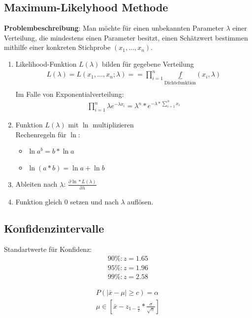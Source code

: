 \documentclass{article}
\begin{document}
\subsection{Maximum-Likelyhood Methode}
\textbf{Problembeschreibung}: Man m\"ochte f\"ur einen unbekannten Parameter $\lambda$
einer Verteilung, die mindestens einen Parameter besitzt, einen Sch\"atzwert bestimmen
mithilfe einer konkreten Stichprobe $(x_1, \ldots, x_n)$.

\begin{enumerate}
	\item Likelihood-Funktion $L(\lambda)$ bilden f\"ur gegebene Verteilung
		\begin{align}
			L(\lambda) = L(x_1, \ldots, x_n; \lambda) = = \prod_{i=1}^n
			\underbrace{f}_{\text{Dichtefunktion}}(x_i, \lambda)\\
		\end{align}
		Im Falle von Exponentialverteilung:\\
		\begin{align}
			\prod_{i=1}^n \lambda e^{-\lambda x_i} = \lambda^n * e^{-\lambda * \sum_{i=1}^{n}x_i}
		\end{align}
	\item Funktion $L(\lambda)$ mit $\ln$ multiplizieren\\
		Rechenregeln f\"ur $\ln$:
		\begin{itemize}
			\item $\ln a^b = b * \ln a$
			\item $\ln (a*b) = \ln a + \ln b$
		\end{itemize}
	\item Ableiten nach $\lambda$: $\frac{\partial \ln * L(\lambda)}{\partial \lambda}$
	\item Funktion gleich $0$ setzen und nach $\lambda$ aufl\"osen.
\end{enumerate}

\subsection{Konfidenzintervalle}
Standartwerte f\"ur Konfidenz:
\begin{align*}
	90\%:z = 1.65\\
	95\%:z = 1.96\\
	99\%:z = 2.58
\end{align*}

\begin{align}
	P(|\bar{x}-\mu| \geq c) = \alpha \\
	\mu \in [\bar{x} - z_{1-\frac{\alpha}{2}} * \frac{\sigma}{\sqrt{n}}]
\end{align}
\end{document}

